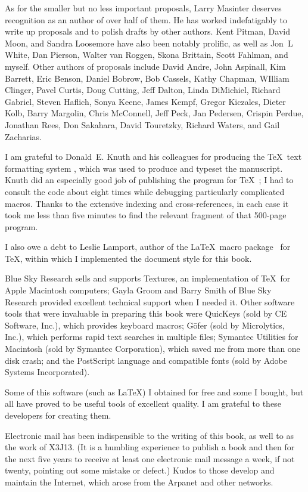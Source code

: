 As for the smaller but no less important proposals,
Larry Masinter deserves recognition as an author of over half of them.
He has worked indefatigably to write up proposals and to polish
drafts by other authors.  Kent Pitman, David Moon, and Sandra Loosemore
have also been notably prolific,
as well as Jon~L White, Dan Pierson, Walter van Roggen,
Skona Brittain, Scott Fahlman, and myself.
Other authors of proposals include
David Andre,
John Aspinall,
Kim Barrett,
Eric Benson,
Daniel Bobrow,
Bob Cassels,
Kathy Chapman,
WIlliam Clinger,
Pavel Curtis,
Doug Cutting,
Jeff Dalton,
Linda DiMichiel,
Richard Gabriel,
Steven Haflich,
Sonya Keene,
James Kempf,
Gregor Kiczales,
Dieter Kolb,
Barry Margolin,
Chris McConnell,
Jeff Peck,
Jan Pedersen,
Crispin Perdue,
Jonathan Rees,
Don Sakahara,
David Touretzky,
Richard Waters, and
Gail Zacharias.

I am grateful to Donald~E. Knuth and his colleagues for producing
the \TeX\ text formatting system \cite{KNUTH-TEXBOOK},
which was used to produce
and typeset the manuscript.
Knuth did an especially good job of publishing the program for
\TeX~\cite{KNUTH-TEX-PROGRAM};
I had to consult the code about eight times while debugging particularly
complicated macros.  Thanks to the extensive indexing
and cross-references, in each case it took me less than five minutes to
find the relevant fragment of that 500-page program.

I also owe a debt
to Leslie Lamport, author of the \LaTeX\ macro package~\cite{LAMPORT-LATEX}
for \TeX,
within which I implemented the document style for this book.

Blue Sky Research sells and supports Textures, an implementation
of \TeX\ for Apple Macintosh computers; Gayla Groom and Barry Smith
of Blue Sky Research provided excellent technical support when I
needed it.  Other software tools that were invaluable
in preparing this book were QuicKeys (sold by CE Software, Inc.),
which provides keyboard macros;
G\=ofer (sold by Microlytics, Inc.), which performs rapid
text searches in multiple files; Symantec Utilities for Macintosh
(sold by Symantec Corporation), which saved me from more than one disk crash;
and the PostScript language and compatible
fonts (sold by Adobe Systems Incorporated).

Some of this software (such as \LaTeX) I obtained for free and some I bought,
but all have proved to be useful tools of excellent quality.
I am grateful to these developers for creating them.

Electronic mail has been indispensible to
the writing of this book, as well to as the work of X3J13.
(It is a humbling experience to publish a book and then for
the next five years to receive
at least one electronic mail message a week, if not twenty, pointing out
some mistake or defect.)
Kudos to those develop and maintain the Internet, which arose
from the Arpanet and other networks.

